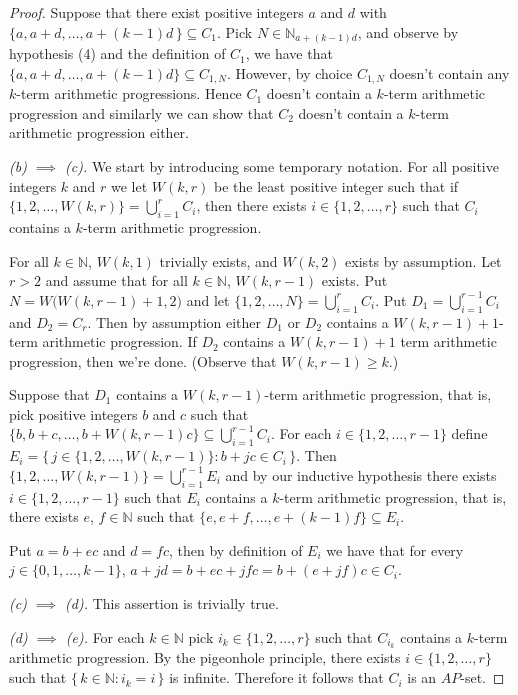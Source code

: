 \documentclass[12pt,showtrims]{memoir}
\theoremstyle{plain}
\theoremstyle{definition}
\newcommand{\bbN}{\mathbb{N}}
\begin{document}
\begin{proof}
  Suppose that there exist positive integers $a$ and $d$ with $\{a, a+d, \ldots, a+(k-1)d \,\} \subseteq C_1$. 
  Pick $N \in \bbN_{a+(k-1)d}$, and observe by hypothesis (4) and the definition of $C_1$, we have that $\{a, a+d, \ldots, a+(k-1)d\} \subseteq C_{1,N}$. 
  However, by choice $C_{1,N}$ doesn't contain any $k$-term arithmetic progressions. 
  Hence $C_1$ doesn't contain a $k$-term arithmetic progression and similarly we can show that $C_2$ doesn't contain a $k$-term arithmetic progression either. 

  \textsl{(b) $\implies$ (c).}
  We start by introducing some temporary notation.
  For all positive integers $k$ and $r$ we let $W(k,r)$ be the least positive integer such that if $\{1, 2, \ldots, W(k,r)\} = \bigcup_{i=1}^r C_i$, then there exists $i \in \{1, 2, \ldots, r\}$ such that $C_i$ contains a $k$-term arithmetic progression.

  For all $k \in \bbN$, $W(k, 1)$ trivially exists, and $W(k, 2)$ exists by assumption.
  Let $r > 2$ and assume that for all $k \in \bbN$, $W(k, r-1)$ exists. 
  Put $N = W\bigl( W(k, r-1)+1, 2 \bigr)$ and let $\{1, 2, \ldots, N\} = \bigcup_{i=1}^r C_i$. 
  Put $D_1 = \bigcup_{i=1}^{r-1} C_i$ and $D_2 = C_r$.
  Then by assumption either $D_1$ or $D_2$ contains a $W(k,r-1)+1$-term arithmetic progression.
  If $D_2$ contains a $W(k,r-1)+1$ term arithmetic progression, then we're done. 
  (Observe that $W(k,r-1) \ge k$.)

  Suppose that $D_1$ contains a $W(k,r-1)$-term arithmetic progression, that is, pick positive integers $b$ and $c$ such that $\{b, b+c, \ldots, b+W(k,r-1)c\} \subseteq \bigcup_{i=1}^{r-1} C_i$. 
  For each $i \in \{1, 2, \ldots, r-1\}$ define $E_i = \bigl\{\, j \in \{1, 2, \ldots, W(k,r-1) \} : b+jc \in C_i \,\bigr\}$.
  Then $\{1, 2, \ldots, W(k, r-1)\} = \bigcup_{i=1}^{r-1} E_i$ and by our inductive hypothesis there exists $i \in \{1, 2, \ldots, r-1\}$ such that $E_i$ contains a $k$-term arithmetic progression, that is, there exists $e$, $f \in \bbN$ such that $\{e, e+f, \ldots, e+(k-1)f\} \subseteq E_i$. 

  Put $a = b+ec$ and $d = fc$, then by definition of $E_i$ we have that for every $j \in \{0, 1, \ldots, k-1\}$, $a + jd = b + ec + jfc = b+(e+jf)c \in C_i$.
  
  
  \textsl{(c) $\implies$ (d).}
  This assertion is trivially true.

  \textsl{(d) $\implies$ (e).}
  For each $k \in \bbN$ pick $i_k \in \{1, 2, \ldots, r\}$ such that $C_{i_k}$ contains a $k$-term arithmetic progression. 
  By the pigeonhole principle, there exists $i \in \{1, 2, \ldots, r\}$ such that $\{\,k \in \bbN : i_k = i\,\}$ is infinite.
  Therefore it follows that $C_i$ is an $AP$-set.


\end{proof}
\end{document}

